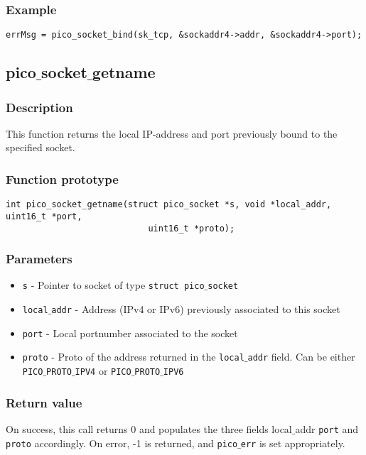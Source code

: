 \subsubsection*{Example}
\begin{verbatim}
errMsg = pico_socket_bind(sk_tcp, &sockaddr4->addr, &sockaddr4->port);
\end{verbatim}

\subsection{pico$\_$socket$\_$getname}

\subsubsection*{Description}
This function returns the local IP-address and port previously bound to the specified socket.

\subsubsection*{Function prototype}
\begin{verbatim}
int pico_socket_getname(struct pico_socket *s, void *local_addr, uint16_t *port, 
                            uint16_t *proto);
\end{verbatim}


\subsubsection*{Parameters}
\begin{itemize}[noitemsep]
\item \texttt{s} - Pointer to socket of type \texttt{struct pico$\_$socket}
\item \texttt{local$\_$addr} - Address (IPv4 or IPv6) previously associated to this socket
\item \texttt{port} - Local portnumber associated to the socket
\item \texttt{proto} - Proto of the address returned in the \texttt{local$\_$addr} field. Can be either \texttt{PICO$\_$PROTO$\_$IPV4} or \texttt{PICO$\_$PROTO$\_$IPV6}
\end{itemize}

\subsubsection*{Return value}
On success, this call returns 0 and populates the three fields {local$\_$addr} \texttt{port} and \texttt{proto} accordingly.
On error, -1 is returned, and \texttt{pico$\_$err} is set appropriately.

